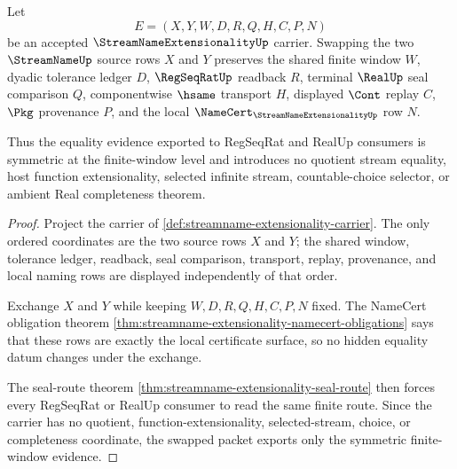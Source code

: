 \begin{theorem}
\label{thm:streamname-extensionality-finite-window-symmetry}
Let
$$
E=(X,Y,W,D,R,Q,H,C,P,N)
$$
be an accepted $\StreamNameExtensionalityUp$ carrier. Swapping the two $\StreamNameUp$ source rows $X$ and $Y$ preserves the shared finite window $W$, dyadic tolerance ledger $D$, $\RegSeqRatUp$ readback $R$, terminal $\RealUp$ seal comparison $Q$, componentwise $\hsame$ transport $H$, displayed $\Cont$ replay $C$, $\Pkg$ provenance $P$, and the local $\NameCert_{\StreamNameExtensionalityUp}$ row $N$.

Thus the equality evidence exported to RegSeqRat and RealUp consumers is symmetric at the finite-window level and introduces no quotient stream equality, host function extensionality, selected infinite stream, countable-choice selector, or ambient Real completeness theorem.
\end{theorem}
\begin{proof}
Project the carrier of \autoref{def:streamname-extensionality-carrier}. The only ordered coordinates are the two source rows $X$ and $Y$; the shared window, tolerance ledger, readback, seal comparison, transport, replay, provenance, and local naming rows are displayed independently of that order.

Exchange $X$ and $Y$ while keeping $W,D,R,Q,H,C,P,N$ fixed. The NameCert obligation theorem \autoref{thm:streamname-extensionality-namecert-obligations} says that these rows are exactly the local certificate surface, so no hidden equality datum changes under the exchange.

The seal-route theorem \autoref{thm:streamname-extensionality-seal-route} then forces every RegSeqRat or RealUp consumer to read the same finite route. Since the carrier has no quotient, function-extensionality, selected-stream, choice, or completeness coordinate, the swapped packet exports only the symmetric finite-window evidence.
\end{proof}

